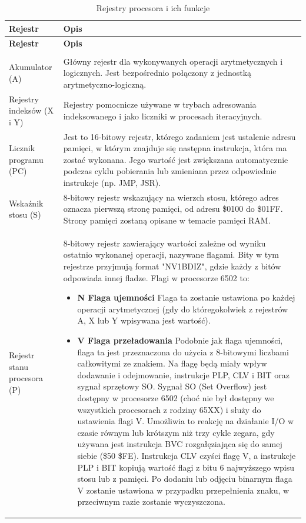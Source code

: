 \begin{longtable}{|p{5cm}|p{11cm}|}
\hline
\textbf{Rejestr} & \textbf{Opis} \\ \hline
\endfirsthead
\hline
\textbf{Rejestr} & \textbf{Opis} \\ \hline
\endhead
\hline
\endfoot
\hline
\caption{Rejestry procesora i ich funkcje} \\
\endlastfoot

Akumulator (A) & Główny rejestr dla wykonywanych operacji arytmetycznych i logicznych. Jest bezpośrednio połączony z jednostką arytmetyczno-logiczną. \\ \hline
Rejestry indeksów (X i Y) & Rejestry pomocnicze używane w trybach adresowania indeksowanego i jako liczniki w procesach iteracyjnych. \\ \hline
Licznik programu (PC) & Jest to 16-bitowy rejestr, którego zadaniem jest ustalenie adresu pamięci, w którym znajduje się następna instrukcja, która ma zostać wykonana. Jego wartość jest zwiększana automatycznie podczas cyklu pobierania lub zmieniana przez odpowiednie instrukcje (np. JMP, JSR). \\ \hline
Wskaźnik stosu (S) & 8-bitowy rejestr wskazujący na wierzch stosu, którego adres oznacza pierwszą stronę pamięci, od adresu \$0100 do \$01FF. Strony pamięci zostaną opisane w temacie pamięci RAM. \\ \hline
Rejestr stanu procesora (P) & 8-bitowy rejestr zawierający wartości zależne od wyniku ostatnio wykonanej operacji, nazywane flagami. Bity w tym rejestrze przyjmują format "NV1BDIZ", gdzie każdy z bitów odpowiada innej fladze. Flagi w procesorze 6502 to:

\begin{itemize}
\item \textbf{N Flaga ujemności}  
Flaga ta zostanie ustawiona po każdej operacji arytmetycznej (gdy do któregokolwiek z rejestrów A, X lub Y wpisywana jest wartość).

\item \textbf{V Flaga przeładowania}  
Podobnie jak flaga ujemności, flaga ta jest przeznaczona do użycia z 8-bitowymi liczbami całkowitymi ze znakiem. Na flagę będą miały wpływ dodawanie i odejmowanie, instrukcje PLP, CLV i BIT oraz sygnał sprzętowy SO. Sygnał SO (Set Overflow) jest dostępny w procesorze 6502 (choć nie był dostępny we wszystkich procesorach z rodziny 65XX) i służy do ustawienia flagi V. Umożliwia to reakcję na działanie I/O w czasie równym lub krótszym niż trzy cykle zegara, gdy używana jest instrukcja BVC rozgałęziająca się do samej siebie (\$50 \$FE). Instrukcja CLV czyści flagę V, a instrukcje PLP i BIT kopiują wartość flagi z bitu 6 najwyższego wpisu stosu lub z pamięci. Po dodaniu lub odjęciu binarnym flaga V zostanie ustawiona w przypadku przepełnienia znaku, w przeciwnym razie zostanie wyczyszczona. 


\end{itemize}
\end{longtable}
